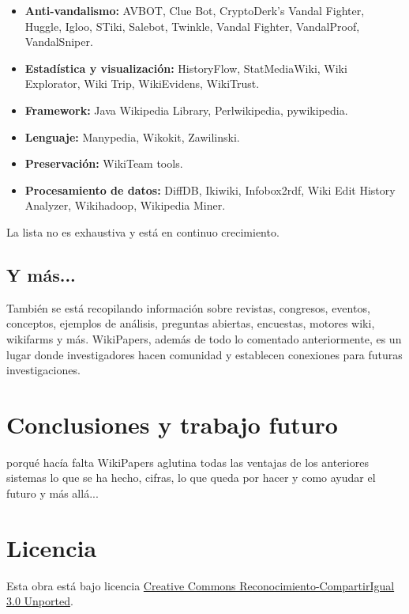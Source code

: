 \documentclass[11pt,twocolumn]{article}
\begin{document}
\begin{itemize}
\item \textbf{Anti-vandalismo:} AVBOT, Clue Bot, CryptoDerk's Vandal Fighter, Huggle, Igloo, STiki, Salebot, Twinkle, Vandal Fighter, VandalProof, VandalSniper.
\item \textbf{Estadística y visualización:} HistoryFlow, StatMediaWiki, Wiki Explorator, Wiki Trip, WikiEvidens, WikiTrust.
\item \textbf{Framework:} Java Wikipedia Library, Perlwikipedia, pywikipedia.
\item \textbf{Lenguaje:} Manypedia, Wikokit, Zawilinski.
\item \textbf{Preservación:} WikiTeam tools.
\item \textbf{Procesamiento de datos:} DiffDB, Ikiwiki, Infobox2rdf, Wiki Edit History Analyzer, Wikihadoop, Wikipedia Miner.
\end{itemize}

La lista no es exhaustiva y está en continuo crecimiento.

\subsection{Y más...}
También se está recopilando información sobre revistas, congresos, eventos, conceptos, ejemplos de análisis, preguntas abiertas, encuestas, motores wiki, wikifarms y más. WikiPapers, además de todo lo comentado anteriormente, es un lugar donde investigadores hacen comunidad y establecen conexiones para futuras investigaciones.

\section{Conclusiones y trabajo futuro}
porqué hacía falta WikiPapers
aglutina todas las ventajas de los anteriores sistemas
lo que se ha hecho, cifras,
lo que queda por hacer y como ayudar
el futuro y más allá...

        


\section{Licencia}
Esta obra está bajo licencia \href{http://creativecommons.org/licenses/by-sa/3.0/}{Creative Commons Reconocimiento-CompartirIgual 3.0 Unported}.
\end{document}
